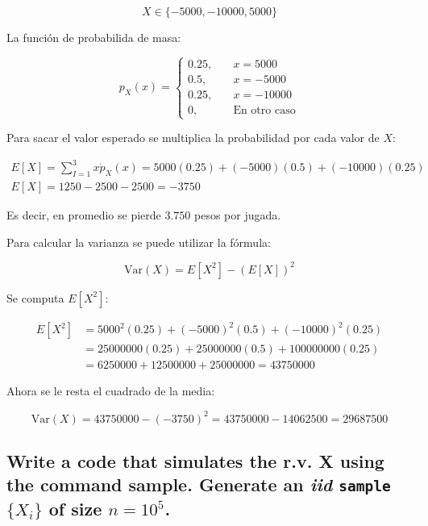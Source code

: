 \documentclass[12pt]{article}\usepackage[]{graphicx}\usepackage[]{xcolor}
\begin{document}
\[
X \in \{-5000, -10000, 5000  \} 
\]

La función de probabilida de masa: 

\[
p_{X} (x)  =
\begin{cases}
  0.25,& \quad x = 5000 \\
  0.5,&  \quad x = -5000 \\
  0.25,& \quad x = -10000 \\
  0,& \quad \text{En otro caso}
\end{cases}
\]

Para sacar el valor esperado se multiplica la probabilidad por cada valor de $X$:

\begin{gather*}
  E[X] = \sum_{I=1}^{3} x \dot p_{X}(x) = 5000(0.25) + (-5000)(0.5) + (-10000)(0.25) \\
  E[X] = 1250 - 2500 - 2500 = -3750
\end{gather*}

Es decir, en promedio se pierde $3.750$ pesos por jugada.

Para calcular la varianza se puede utilizar la fórmula:

\[
\mathrm{Var}(X) = E[X^{2}] - (E[X])^{2}
\]

Se computa $E[X^{2}]$:

\begin{align*}
  E[X^{2}] &= 5000^{2}(0.25) + (-5000)^{2}(0.5) + (-10000)^{2}(0.25) \\
           &= 25000000 (0.25) + 25000000 (0.5) + 100000000 (0.25) \\
  &= 6250000 + 12500000 + 25000000 = 43750000
\end{align*}

Ahora se le resta el cuadrado de la media:

\[
\mathrm{Var}(X) = 43750000 - (-3750)^{2} = 43750000 - 14062500 = 29687500
\]






\subsection{Write a code that simulates the r.v. \textbf{X} using the command sample. Generate an \textit{iid} \lstinline|sample| $\{X_{i}\}$ of size $n = 10^{5}$.}
\end{document}

